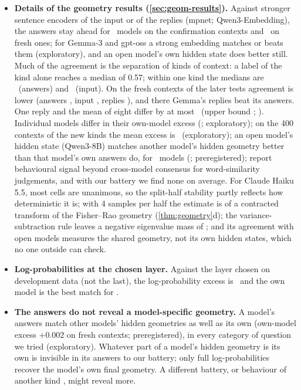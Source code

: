 \begin{itemize}
\item \textbf{Details of the geometry results (\cref{sec:geom-results}).} Against stronger sentence encoders of the input or of the replies (mpnet; Qwen3-Embedding), the answers stay ahead for \StrongConfirm\ models on the confirmation contexts and \StrongFresh\ on fresh ones; for Gemma-3 and gpt-oss a strong embedding matches or beats them (exploratory), and an open model's own hidden state does better still. Much of the agreement is the separation of kinds of context: a label of the kind alone reaches a median of 0.57; within one kind the medians are \WKAns\ (answers) and \WKText\ (input). On the fresh contexts of the later tests agreement is lower (answers \GSixAns, input \GSixText, replies \GSixRep), and there Gemma's replies beat its answers. One reply and the mean of eight differ by at most \GFiveSatPoint\ (upper bound \GFiveSat; \GFiveOut). Individual models differ in their own-model excess (\GSixPerModel; exploratory); on the 400 contexts of the new kinds the mean excess is \GSixNewExcess\ (exploratory); an open model's hidden state (Qwen3-8B) matches another model's hidden geometry better than that model's own answers do, for \GSixSTwo\ models (\GSixSTwoRange; preregistered); \citet{schiekiera2026associations} report behavioural signal beyond cross-model consensus for word-similarity judgements, and with our battery we find none on average. For Claude Haiku 5.5, most cells are unanimous, so the split-half stability partly reflects how deterministic it is; with 4 samples per half the estimate is of a contracted transform of the Fisher--Rao geometry (\cref{thm:geometry}d); the variance-subtraction rule leaves a negative eigenvalue mass of \CFClosedANeg; and its agreement with open models measures the shared geometry, not its own hidden states, which no one outside can check.
\item \textbf{Log-probabilities at the chosen layer.} Against the layer chosen on development data (not the last), the log-probability excess is \GSevCLogprob\ and the own model is the best match for \GSevCBestLogprob.
\item \textbf{The answers do not reveal a model-specific geometry.} A model's answers match other models' hidden geometries as well as its own (own-model excess $+0.002$ on fresh contexts; preregistered), in every category of question we tried (exploratory). Whatever part of a model's hidden geometry is its own is invisible in its answers to our battery; only full log-probabilities recover the model's own final geometry. A different battery, or behaviour of another kind \citep{schiekiera2026associations}, might reveal more.

\end{itemize}
